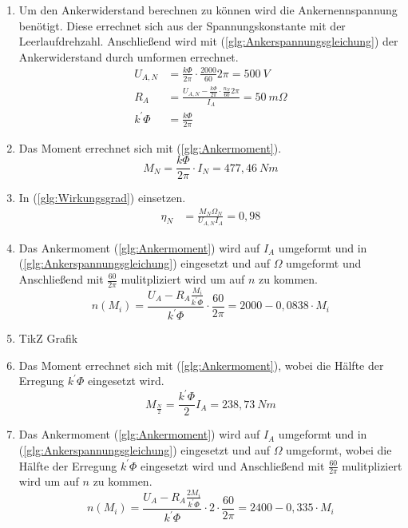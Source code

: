 \begin{solution}
\begin{enumerate}
\item Um den Ankerwiderstand berechnen zu können wird die Ankernennspannung benötigt. Diese errechnet sich aus der Spannungskonstante mit der Leerlaufdrehzahl. Anschließend wird mit (\ref{glg:Ankerspannungsgleichung}) der Ankerwiderstand durch umformen errechnet.\\
\begin{align}
U_{A,N} &= \frac{k \Phi}{2 \pi} \cdot \frac{2000}{60} 2 \pi = 500~V\\
R_A &= \frac{U_{A,N} - \frac{k \Phi}{2 \pi} \cdot \frac{n_N}{60} 2 \pi}{I_A}=50~m \Omega\\
k^{'}\Phi&= \frac{k \Phi}{2 \pi}
\end{align}
\item Das Moment errechnet sich mit (\ref{glg:Ankermoment}).\\
\begin{equation}
M_N=\frac{k \Phi}{2 \pi} \cdot I_N =477,46~Nm
\end{equation}
\item In (\ref{glg:Wirkungsgrad}) einsetzen.
\begin{align}
\eta_N &= \frac{M_N \Omega_N}{U_{A,N} I_A} = 0,98
\end{align}
\item Das Ankermoment (\ref{glg:Ankermoment}) wird auf $I_A$ umgeformt und in (\ref{glg:Ankerspannungsgleichung}) eingesetzt und auf $\Omega$ umgeformt und Anschließend mit $\frac{60}{2 \pi}$ mulitpliziert wird um auf $n$ zu kommen.
\begin{equation}
n(M_i) = \frac{U_A - R_A \frac{M_i}{k^{'} \Phi}}{k^{'}\Phi} \cdot \frac{60}{2 \pi}=2000-0,0838 \cdot M_i
\end{equation}
\item TikZ Grafik
\item Das Moment errechnet sich mit (\ref{glg:Ankermoment}), wobei die Hälfte der Erregung $k^{'} \Phi$ eingesetzt wird.
\begin{equation}
M_{\frac{N}{2}} = \frac{k^{'}\Phi}{2} I_A =238,73~Nm
\end{equation}
\item Das Ankermoment (\ref{glg:Ankermoment}) wird auf $I_A$ umgeformt und in (\ref{glg:Ankerspannungsgleichung}) eingesetzt und auf $\Omega$ umgeformt, wobei die Hälfte der Erregung $k^{'} \Phi$ eingesetzt wird und Anschließend mit $\frac{60}{2 \pi}$ mulitpliziert wird um auf $n$ zu kommen.
\begin{equation}
n(M_i) = \frac{U_A - R_A \frac{2 M_i}{k^{'} \Phi}}{k^{'}\Phi} \cdot 2 \cdot \frac{60}{2 \pi} =2400-0,335 \cdot M_i
\end{equation}
\end{enumerate}
\end{solution}